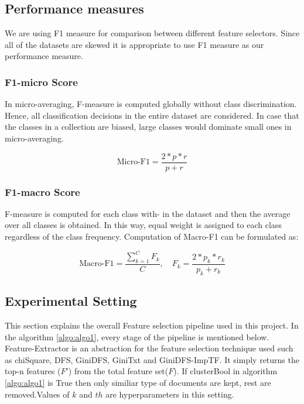 \documentclass[a4paper, 14pt]{article}
\begin{document}
\begin{justify}
\subsection{Performance measures}
\begin{justify}

We are using F1 measure for comparison between different feature selectors. Since all of the datasets are skewed it is appropriate to use F1 measure as our performance measure.



\subsubsection{F1-micro Score}
\begin{justify}
In micro-averaging, F-measure is computed globally without class discrimination. Hence, all classification decisions in the entire dataset are considered. In case that the classes in a collection are biased, large classes would dominate small ones in
micro-averaging. 

\[ \text{Micro-F1} = \frac{2*p*r}{p+r}
\]    

\end{justify}

\subsubsection{F1-macro Score}
\begin{justify}
F-measure is computed for each class with-
in the dataset and then the average over all classes is obtained. In
this way, equal weight is assigned to each class regardless of the
class frequency. Computation of Macro-F1 can be formulated as:

\[ \text{Macro-F1} = \frac{\sum_{k=1}^{C}F_{k}}{C}, \quad F_{k} = \frac{2*p_{k}*r_{k}}{p_{k}+r_{k}} \]



\end{justify}

\end{justify}
\newpage
\subsection{Experimental Setting}
\begin{justify}

This section explains the overall Feature selection pipeline used in this project. In the algorithm \ref{algo:algo1}, every stage of the pipeline is mentioned below. Feature-Extractor is an abstraction for the feature selection technique used such as chiSquare, DFS, GiniDFS, GiniTxt and GiniDFS-ImpTF. It simply returns the top-n features ($F'$) from the total feature set($F$).
If clusterBool in algorithm \ref{algo:algo1} is True then only similiar type of documents are kept, rest are removed.Values of $k$ and $th$ are hyperparameters in this setting.
 


\end{justify}
\end{justify}
\end{document}
